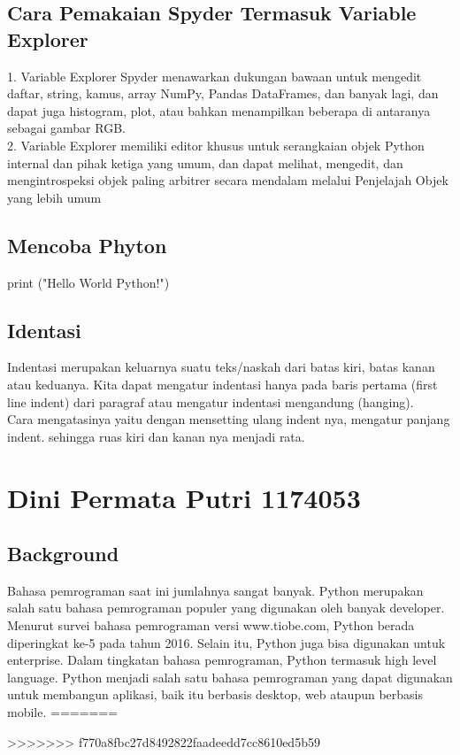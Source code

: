 \subsection{Cara Pemakaian Spyder Termasuk Variable Explorer}
1. Variable Explorer Spyder menawarkan dukungan bawaan untuk mengedit daftar, string, kamus, array NumPy, Pandas DataFrames, dan banyak lagi, dan dapat juga histogram, plot, atau bahkan menampilkan beberapa di antaranya sebagai gambar RGB.\\
2. Variable Explorer memiliki editor khusus untuk serangkaian objek Python internal dan pihak ketiga yang umum, dan dapat melihat, mengedit, dan mengintrospeksi objek paling arbitrer secara mendalam melalui Penjelajah Objek yang lebih umum\\

\subsection{Mencoba Phyton}
print ("Hello World Python!")

\subsection{Identasi}
Indentasi merupakan keluarnya suatu teks/naskah dari batas kiri, batas kanan atau keduanya. Kita dapat mengatur indentasi hanya pada baris pertama (first line indent) dari paragraf atau mengatur indentasi mengandung (hanging).\\

Cara mengatasinya yaitu dengan mensetting ulang indent nya, mengatur panjang indent. sehingga ruas kiri dan kanan nya menjadi rata.


\section{Dini Permata Putri 1174053}
\subsection{Background}
Bahasa pemrograman saat ini jumlahnya sangat banyak. Python merupakan salah satu bahasa
pemrograman populer yang digunakan oleh banyak developer. Menurut survei bahasa pemrograman
versi www.tiobe.com, Python berada diperingkat ke-5 pada tahun 2016. Selain itu, Python juga bisa
digunakan untuk enterprise. Dalam tingkatan bahasa pemrograman, Python termasuk high level
language. Python menjadi salah satu bahasa pemrograman yang dapat digunakan untuk membangun
aplikasi, baik itu berbasis desktop, web ataupun berbasis mobile.
=======

>>>>>>> f770a8fbc27d8492822faadeedd7cc8610ed5b59
